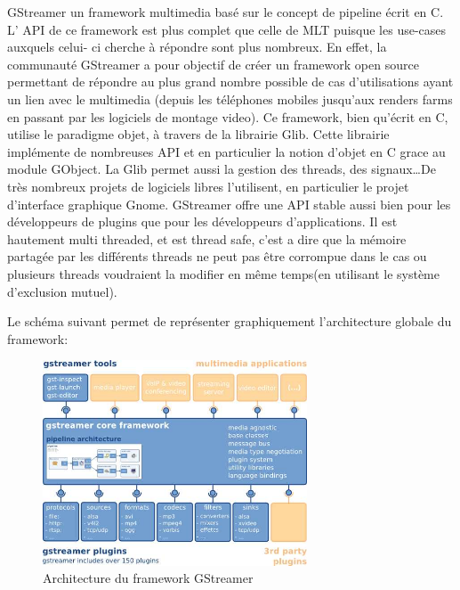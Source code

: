 GStreamer un framework multimedia basé sur le concept de pipeline
écrit en C.  L' API de ce framework est plus complet que celle de
MLT puisque les use-cases auxquels celui- ci cherche à répondre sont
plus nombreux. En effet, la communauté GStreamer a pour objectif de
créer un framework open source permettant de répondre au plus grand
nombre possible de cas d'utilisations ayant un lien avec le multimedia
(depuis les téléphones mobiles jusqu'aux renders farms en passant par
les logiciels de montage video).  Ce framework, bien qu'écrit en C,
utilise le paradigme objet, à travers de la librairie Glib. Cette
librairie implémente de nombreuses API et en particulier la notion
d'objet en C grace au module GObject. La Glib permet aussi la gestion
des threads, des signaux\ldots De très nombreux projets de logiciels
libres l'utilisent, en particulier le projet d'interface graphique
Gnome. GStreamer offre une API stable aussi bien pour les développeurs
de plugins que pour les développeurs d'applications. Il est hautement
multi threaded, et est thread safe,
c'est a dire que la mémoire partagée par les différents threads ne
peut pas être corrompue dans le cas ou plusieurs threads voudraient la
modifier en même temps(en utilisant le système d'exclusion mutuel).

Le schéma suivant permet de représenter graphiquement l'architecture
globale du framework:

\begin{figure}

  \begin{center}

    \includegraphics[width=0.70\textwidth]{images/gstoverview}

  \end{center}

  \caption{Architecture du framework GStreamer}

  \label{Yes}

\end{figure}

